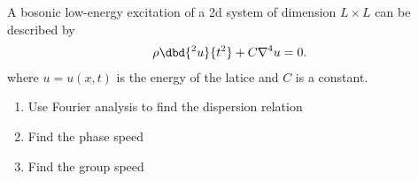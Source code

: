 
     A bosonic low-energy excitation of a 2d system of dimension
        $L\times L$ can be described by
        \begin{align}
            \rho \dbd{^2 u}{t^2} + C\nabla^4 u=0.
        \end{align}
	where $u=u(x,t)$ is the energy of the latice and $C$ is a constant.
        \begin{enumerate}
            \item {}Use Fourier analysis to find the dispersion relation
            \item {}Find the phase speed
            \item {}Find the group speed
        \end{enumerate}

